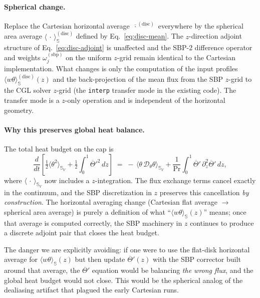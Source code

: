 \documentclass[11pt]{article}
\newcommand{\meanS}[1]{\langle #1 \rangle_{\mathbb{S}}}
\newcommand{\Pr}{\mathrm{Pr}}
\begin{document}
\paragraph{Spherical change.}  Replace the Cartesian horizontal
average $\overline{\,\cdot\,}^{(\mathrm{disc})}$ everywhere by the
spherical area average $\meanS{\,\cdot\,}^{(\mathrm{disc})}$ defined
by Eq.~\eqref{eq:disc-mean}.  The $z$-direction adjoint structure of
Eq.~\eqref{eq:disc-adjoint} is unaffected and the SBP-2 difference
operator and weights $\omega_{j}^{(\mathrm{sbp})}$ on the uniform
$z$-grid remain identical to the Cartesian implementation.  What
changes is only the computation of the input profiles
$\meanS{w\theta}^{(\mathrm{disc})}(z)$ and the back-projection of
the mean flux from the SBP $z$-grid to the CGL solver $z$-grid (the
\verb|interp| transfer mode in the existing code).  The transfer
mode is a $z$-only operation and is independent of the horizontal
geometry.

\paragraph{Why this preserves global heat balance.}  The total heat
budget on the cap is
\begin{equation}
  \frac{d}{dt}\!\left[\tfrac{1}{2}\meanS{\theta^{2}}_{V}
  + \tfrac{1}{2}\!\int_{0}^{1}\overline{\Theta}'^{2}\,dz\right]
  \;=\; -\,\meanS{\theta\,\mathcal{D}_{\theta}\theta}_{V}
  + \frac{1}{\Pr}\!\int_{0}^{1}\overline{\Theta}'\,
  \partial_{z}^{2}\overline{\Theta}'\,dz,
\end{equation}
where $\meanS{\,\cdot\,}_{V}$ now includes a $z$-integration.  The
flux exchange terms cancel exactly in the continuum, and the SBP
discretization in $z$ preserves this cancellation \emph{by
construction}.  The horizontal averaging change (Cartesian flat
average $\to$ spherical area average) is purely a definition of what
``$\meanS{w\theta}(z)$'' means; once that average is computed
correctly, the SBP machinery in $z$ continues to produce a discrete
adjoint pair that closes the heat budget.

The danger we are explicitly avoiding: if one were to use the
flat-disk horizontal average for $\meanS{w\theta}(z)$ but then
update $\overline{\Theta}'(z)$ with the SBP corrector built around
that average, the $\overline{\Theta}'$ equation would be balancing
\emph{the wrong flux}, and the global heat budget would not close.
This would be the spherical analog of the dealiasing artifact that
plagued the early Cartesian runs.
\end{document}
